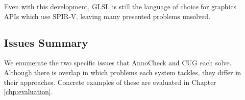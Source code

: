\documentclass[a4paper,12pt,twoside,openright]{report}
\begin{document}
Even with this development, GLSL is still the language of choice for graphics
APIs which use SPIR-V, leaving many presented problems unsolved.






\subsection{Issues Summary}

\label{sec:issues_summary}

We enumerate the two specific issues that AnnoCheck and CUG each solve.
Although there is overlap in which problems each system tackles, they differ in
their approaches. Concrete examples of these are evaluated in Chapter
\ref{chp:evaluation}.
\end{document}
